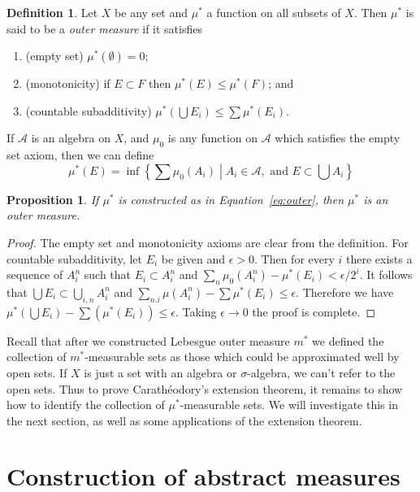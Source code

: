 \documentclass[11pt,oneside]{amsbook}
\theoremstyle{definition}
\theoremstyle{plain}
\newtheorem{prop}[thm]{Proposition}
\theoremstyle{definition}
\newtheorem{defn}[thm]{Definition}
\theoremstyle{remark}
\numberwithin{equation}{section}
\numberwithin{figure}{section}
\begin{document}
\begin{defn}
  Let $X$ be any set and $\mu^*$ a function on all subsets of $X$. Then $\mu^*$ is said to be a \emph{outer measure} if it satisfies
  \begin{enumerate}
  \item (empty set) $\mu^*(\emptyset)=0$;
  \item (monotonicity) if $E\subset F$ then $\mu^*(E)\leq\mu^*(F)$; and
  \item (countable subadditivity) $\mu^*(\bigcup E_i)\leq\sum\mu^*(E_i)$.
  \end{enumerate}
\end{defn}

If $\mathcal A$ is an algebra on $X$, and $\mu_0$ is any function on $\mathcal A$ which satisfies the empty set axiom, then we can define
\begin{equation}
  \label{eq:outer}
  \mu^*(E)=\inf\left\{\left.\sum\mu_0(A_i)\;\right|\;A_i\in\mathcal A,\text{ and }E\subset\bigcup A_i\right\}
\end{equation}

\begin{prop}
  If $\mu^*$ is constructed as in Equation~\eqref{eq:outer}, then $\mu^*$ is an outer measure.
\end{prop}

\begin{proof}
  The empty set and monotonicity axioms are clear from the definition. For countable subadditivity, let $E_i$ be given and $\epsilon>0$. Then for every $i$ there exists a sequence of $A_i^n$ such that $E_i\subset A_i^n$ and $\sum_n\mu_0(A_i^n)-\mu^*(E_i)<\epsilon/2^i$. It follows that $\bigcup E_i\subset\bigcup_{i,n} A_i^n$ and $\sum_{n.i}\mu(A_i^n)-\sum\mu^*(E_i)\leq\epsilon$. Therefore we have $\mu^*(\bigcup E_i)-\sum(\mu^*(E_i))\leq\epsilon$. Taking $\epsilon\to0$ the proof is complete.
\end{proof}

Recall that after we constructed Lebesgue outer measure $m^*$ we defined the collection of $m^*$-measurable sets as those which could be approximated well by open sets. If $X$ is just a set with an algebra or $\sigma$-algebra, we can't refer to the open sets. Thus to prove Carath\'eodory's extension theorem, it remains to show how to identify the collection of $\mu^*$-measurable sets. We will investigate this in the next section, as well as some applications of the extension theorem.

\newpage
\section{Construction of abstract measures}
\end{document}
